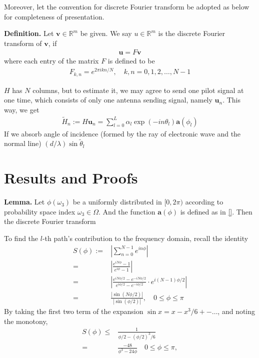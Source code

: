 \documentclass[12pt]{article}
\begin{document}
Moreover, let the convention for discrete Fourier transform be adopted as below for completeness of presentation.

\textbf{Definition.} Let \(\mathbf{v} \in \mathbb{R}^m\) be given.
We say \(u \in \mathbb{R}^m\) is the discrete Fourier transform of \(\mathbf{v}\), if
\begin{gather*}
\mathbf{u} =F \mathbf{v}
\end{gather*}
where each entry of the matrix \(F\) is defined to be
\begin{gather*}
F_{k,n} =e^{2\pi ikn/N},
\quad k,n =0,1,2,\dotsc, N-1
\end{gather*}

\(H\) has \(N\) columns, but to estimate it, we may agree to send one pilot signal at one time, which consists of only one antenna sending signal, namely \(\mathbf{u}_n\).
This way, we get
\begin{gather*}
\tilde{H}_n
:=H \mathbf{u}_n
=\sum_{l=0}^L \alpha_l \exp(-i n \theta_l) \mathbf{a}(\phi_l)
\end{gather*}
If we absorb angle of incidence (formed by the ray of electronic wave and the normal line)
\((d/\lambda) \sin \tilde{\theta}_l\)


\section{Results and Proofs}

\textbf{Lemma.} Let \(\phi(\omega_3)\) be a uniformly distributed in \([0,2\pi)\) according to probability space index \(\omega_3 \in \Omega\).
And the function \(\mathbf{a}(\phi)\) is defined as in \eqref{}.
Then the discrete Fourier transform 

To find the \(l\)-th path's contribution to the frequency domain, recall the identity
\begin{align*}
S(\phi)
:=&\left| \sum_{n=0}^{N-1} e^{i n \phi} \right| \\
=&\left| \frac{e^{i N \phi} -1}{e^{i \phi} -1} \right| \\
=&\left| \frac{e^{i N \phi/2} -e^{-i N \phi/2}}{e^{i \phi /2} -e^{-i \phi /2}} \cdot e^{i (N-1) \phi/2} \right| \\
=&\frac{|\sin(N \phi/2)|}{|\sin(\phi /2)|},
\quad 0 \leq \phi \leq \pi
\end{align*}
By taking the first two term of the expansion \(\sin x =x -x^3/6 +- \dotsc\), and noting the monotony, 
\begin{align*}
S(\phi)
\leq& \frac{1}{\phi/2 -(\phi/2)^3/6} \\
=& \frac{-48}{\phi^3 -24\phi}
\quad 0 \leq \phi \leq \pi,
\end{align*}
\end{document}
